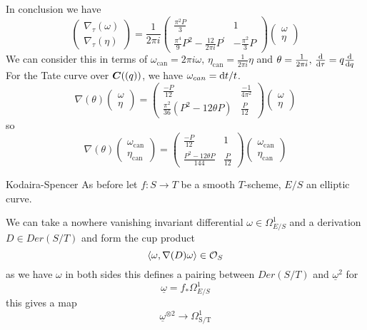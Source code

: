 \begin{frame}
    In conclusion we have
    \[
        \left(\begin{array}{c}
\nabla_\tau(\omega) \\
\nabla_{\tau}(\eta)
\end{array}\right)=\frac{1}{2 \pi i}\left(\begin{array}{cc}
\frac{\pi^{2} P}{3} & 1 \\
\frac{\pi^{4}}{9} P^{2}-\frac{12}{2 \pi i} P^{\prime} & -\frac{\pi^{2}}{3} P
\end{array}\right)\left(\begin{array}{l}
\omega \\
\eta
\end{array}\right)
\]
We can consider this in terms of $\omega_{\mathrm{can}}=2 \pi i \omega,\, \eta_{\mathrm{can}}=\frac{1}{2 \pi i} \eta$ and $\theta=\frac{1}{2 \pi i},\, \frac{\mathop{}\!\mathrm{d}}{\mathop{}\!\mathrm{d} \tau}=q \frac{\mathop{}\!\mathrm{d}}{\mathop{}\!\mathrm{d} q}$
For the Tate curve over $\bm C((q))$, we have $\omega_{can} = \mathop{}\!\mathrm{d} t / t$.
\[
\nabla(\theta)\left(\begin{array}{c}
\omega \\
\eta
\end{array}\right)=\left(\begin{array}{cc}
\frac{-P}{12} & \frac{-1}{4 \pi^{2}} \\
\frac{\pi^{2}}{36}\left(P ^{2}-12 \theta P \right) & \frac{P }{12}
\end{array}\right)\left(\begin{array}{c}
\omega \\
\eta
\end{array}\right)
\]
so
\[
    \nabla(\theta)\left(\begin{array}{c}
\omega_{\mathrm{can}} \\
\eta_{\mathrm{can}}
\end{array}\right)=\left(\begin{array}{cc}
\frac{-P}{12} & 1 \\
\frac{P^{2}-12 \theta {P}}{144} & \frac{{P}}{12}
\end{array}\right)\left(\begin{array}{l}
\omega_{\mathrm{can}} \\
\eta_{\mathrm{can}}
\end{array}\right)
\]
\end{frame}

\begin{frame}{Kodaira-Spencer}
    As before let $f\colon S \rightarrow T$ be a smooth $T$-scheme, $E/S$ an elliptic curve.

    We can take a nowhere vanishing invariant differential $\omega \in \Omega_{E/S}^1$ and a derivation $D\in Der(S/T)$ and form the cup product
    \[ \left\langle \omega, \nabla(D) \omega \right\rangle \in \operatorname{\mathcal{O}}_S\]
    as we have $\omega$ in both sides this defines a pairing between $Der(S/T)$ and $\underline \omega^2$ for
    \[\underline \omega = f_{*} \Omega_{E / S}^{1} \]
    this gives a map
    \[
        \underline{\omega}^{\otimes 2}\to \Omega_{\mathrm{S} / \mathrm{T}}^{1}
    \]
\end{frame}


